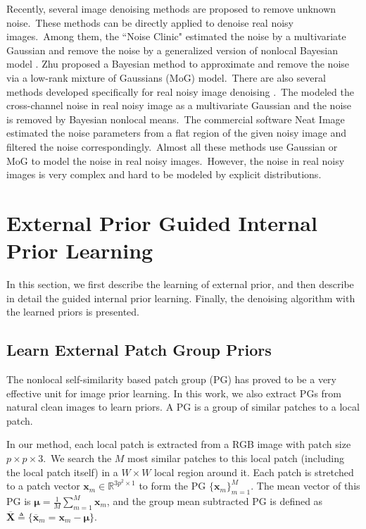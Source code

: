 \documentclass[10pt,twocolumn,letterpaper]{article}
\begin{document}
Recently, several image denoising methods \cite{Liu2008,almapg,noiseclinic,ncwebsite,Zhu_2016_CVPR,crosschannel2016} are proposed to remove unknown noise.\ These methods can be directly applied to denoise real noisy images.\ Among them, the ``Noise Clinic" \cite{noiseclinic,ncwebsite} estimated the noise by a multivariate Gaussian and remove the noise by a generalized version of nonlocal Bayesian model \cite{nlbayes}. Zhu \etal proposed a Bayesian method \cite{Zhu_2016_CVPR} to approximate and remove the noise via a low-rank mixture of Gaussians (MoG) model.\ There are also several methods developed specifically for real noisy image denoising \cite{crosschannel2016,neatimage}.\ The \cite{crosschannel2016} modeled the cross-channel noise in real noisy image as a multivariate Gaussian and the noise is removed by Bayesian nonlocal means.\ The commercial software Neat Image \cite{neatimage} estimated the noise parameters from a flat region of the given noisy image and filtered the noise correspondingly.\ Almost all these methods \cite{Liu2008,almapg,noiseclinic,ncwebsite,Zhu_2016_CVPR,crosschannel2016} use Gaussian or MoG to model the noise in real noisy images.\ However, the noise in real noisy images is very complex and hard to be modeled by explicit distributions.

\section{External Prior Guided Internal Prior Learning}

In this section, we first describe the learning of external prior, and then describe in detail the guided internal prior learning. Finally, the denoising algorithm with the learned priors is presented.

\subsection{Learn External Patch Group Priors}

The nonlocal self-similarity based patch group (PG) \cite{pgpd} has proved to be a very effective unit for image prior learning. In this work, we also extract PGs from natural clean images to learn priors. A PG is a group of similar patches to a local patch. 

In our method, each local patch is extracted from a RGB image with patch size $p\times p \times 3$.\ We search the $M$ most similar patches to this local patch (including the local patch itself) in a $W\times W$ local region around it. Each patch is stretched to a patch vector $\mathbf{x}_{m}\in \mathbb{R}^{3p^{2}\times1}$ to form the PG $\{\mathbf{x}_{m}\}_{m=1}^{M}$. The mean vector of this PG is $\bm{\mu}=\frac{1}{M}\sum_{m=1}^{M}\mathbf{x}_{m}$, and the group mean subtracted PG is defined as $\mathbf{\overline{X}}\triangleq \{\mathbf{\overline{x}}_{m}=\mathbf{x}_{m}-\bm{\mu}\}$.
\end{document}
